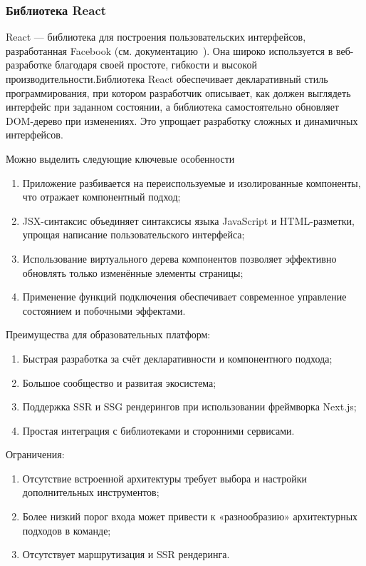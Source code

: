 \subsubsection{Библиотека React}

React — библиотека для построения пользовательских интерфейсов, разработанная Facebook (см. документацию~\cite{react_getting_started}). Она широко используется в веб-разработке благодаря своей простоте, гибкости и высокой производительности.Библиотека React обеспечивает декларативный стиль программирования, при котором разработчик описывает, как должен выглядеть интерфейс при заданном состоянии, а библиотека самостоятельно обновляет DOM-дерево при изменениях. Это упрощает разработку сложных и динамичных интерфейсов.

Можно выделить следующие ключевые особенности
\begin{enumerate}
  \item Приложение разбивается на переиспользуемые и изолированные компоненты, что отражает компонентный подход;
  \item JSX-синтаксис объединяет синтаксисы языка JavaScript и HTML-разметки, упрощая написание пользовательского интерфейса;
  \item Использование виртуального дерева компонентов позволяет эффективно обновлять только изменённые элементы страницы;
  \item Применение функций подключения обеспечивает современное управление состоянием и побочными эффектами.
\end{enumerate}


Преимущества для образовательных платформ:
\begin{enumerate}
  \item Быстрая разработка за счёт декларативности и компонентного подхода;
  \item Большое сообщество и развитая экосистема;
  \item Поддержка SSR и SSG рендерингов при использовании фреймворка Next.js;
  \item Простая интеграция с библиотеками и сторонними сервисами.
\end{enumerate}

Ограничения:
\begin{enumerate}
  \item Отсутствие встроенной архитектуры требует выбора и настройки дополнительных инструментов;
  \item Более низкий порог входа может привести к «разнообразию» архитектурных подходов в команде;
  \item Отсутствует маршрутизация и SSR рендеринга.
\end{enumerate}

